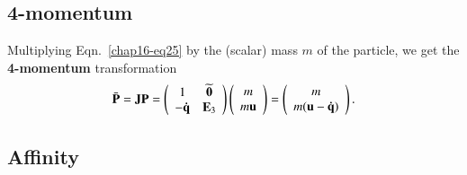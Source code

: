 \subsection{4-momentum}\label{chap16-sec6.4}

Multiplying Eqn.~\eqref{chap16-eq25} by  the (scalar) mass $m$ of the particle, we get the \textbf{4-momentum} transformation
\begin{equation}
\bar{\mathbf{P}}=\mathbf{J}{\mathbf{P}}=\left(\begin{array}{cc} 1 & \widetilde{\mathbf{0}}\\
-\mathbf{\dot{q}} & \mathbf{E}_3 \end{array}\right)
\left(\begin{array}{c} m \\ m\mathbf{u} 
\end{array}\right)=\left(\begin{array}{c} 
m\\ m(\mathbf{u}-\mathbf{\dot{q}}) \end{array}\right).\label{chap16-eq26}
\end{equation}

\subsection{Affinity}\label{chap16-sec6.5}

